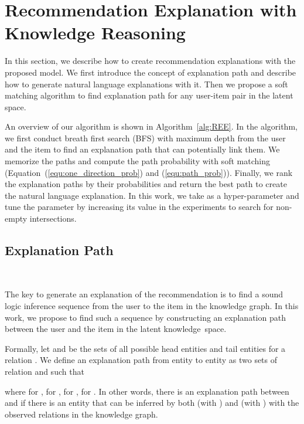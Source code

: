 \documentclass[algorithms,article,accept,moreauthors,pdftex,10pt,a4paper]{Definitions/mdpi}
\begin{document}
\section{Recommendation Explanation with Knowledge Reasoning}\label{sec:explanation}



In this section, we describe how to create recommendation explanations with the proposed model.
We first introduce the concept of explanation path and describe how to generate natural language explanations with it.
Then we propose a soft matching algorithm to find explanation path for any user-item pair in the latent space.

An overview of our algorithm is shown in Algorithm~\ref{alg:REE}.
In the algorithm, we first conduct breath first search (BFS) with maximum depth  from the user  and the item  to find an explanation path that can potentially link them. 
We memorize the paths and compute the path probability with soft matching (Equation~(\ref{equ:one_direction_prob}) and (\ref{equ:path_prob})).
Finally, we rank the explanation paths by their probabilities and return the best path to create the natural language explanation. In this work, we take  as a hyper-parameter and tune the parameter by increasing its value in the experiments to search for non-empty intersections.


\subsection{Explanation Path}~\label{sec:path}

The key to generate an explanation of the recommendation is to find a sound logic inference sequence from the user to the item in the knowledge graph.
In this work, we propose to find such a sequence by constructing an explanation path between the user and the item in the latent knowledge~space.

Formally, let  and  be the sets of all possible head entities and tail entities for a relation . 
We define an explanation path from entity  to entity  as two sets of relation  and  such that

where  for ,  for ,  for ,    for .
In other words, there is an explanation path between  and  if there is an entity that can be inferred by both  (with ) and  (with ) with the observed relations in the knowledge graph.
\end{document}
